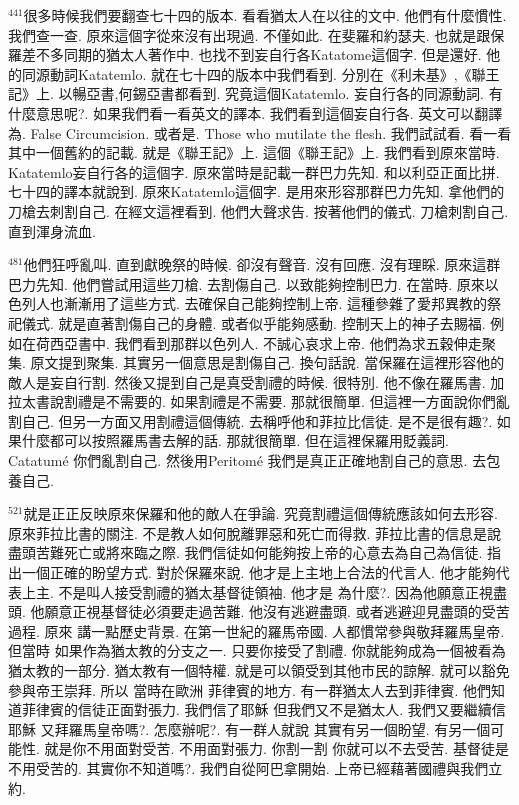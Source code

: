 \documentclass{book}
\begin{document}
$^{441}$很多時候我們要翻查七十四的版本.
看看猶太人在以往的文中.
他們有什麼慣性.
我們查一查.
原來這個字從來沒有出現過.
不僅如此.
在斐羅和約瑟夫.
也就是跟保羅差不多同期的猶太人著作中.
也找不到妄自行各Katatome這個字.
但是還好.
他的同源動詞Katatemlo.
就在七十四的版本中我們看到.
分別在《利未基》,《聯王記》上.
以暢亞書,何錫亞書都看到.
究竟這個Katatemlo.
妄自行各的同源動詞.
有什麼意思呢?.
如果我們看一看英文的譯本.
我們看到這個妄自行各.
英文可以翻譯為.
False Circumcision.
或者是.
Those who mutilate the flesh.
我們試試看.
看一看其中一個舊約的記載.
就是《聯王記》上.
這個《聯王記》上.
我們看到原來當時.
Katatemlo妄自行各的這個字.
原來當時是記載一群巴力先知.
和以利亞正面比拼.
七十四的譯本就說到.
原來Katatemlo這個字.
是用來形容那群巴力先知.
拿他們的刀槍去刺割自己.
在經文這裡看到.
他們大聲求告.
按著他們的儀式.
刀槍刺割自己.
直到渾身流血.

$^{481}$他們狂呼亂叫.
直到獻晚祭的時候.
卻沒有聲音.
沒有回應.
沒有理睬.
原來這群巴力先知.
他們嘗試用這些刀槍.
去割傷自己.
以致能夠控制巴力.
在當時.
原來以色列人也漸漸用了這些方式.
去確保自己能夠控制上帝.
這種參雜了愛邦異教的祭祀儀式.
就是直著割傷自己的身體.
或者似乎能夠感動.
控制天上的神子去賜福.
例如在荷西亞書中.
我們看到那群以色列人.
不誠心哀求上帝.
他們為求五穀伸走聚集.
原文提到聚集.
其實另一個意思是割傷自己.
換句話說.
當保羅在這裡形容他的敵人是妄自行割.
然後又提到自己是真受割禮的時候.
很特別.
他不像在羅馬書.
加拉太書說割禮是不需要的.
如果割禮是不需要.
那就很簡單.
但這裡一方面說你們亂割自己.
但另一方面又用割禮這個傳統.
去稱呼他和菲拉比信徒.
是不是很有趣?.
如果什麼都可以按照羅馬書去解的話.
那就很簡單.
但在這裡保羅用貶義詞.
Catatumé 你們亂割自己.
然後用Peritomé 我們是真正正確地割自己的意思.
去包養自己.

$^{521}$就是正正反映原來保羅和他的敵人在爭論.
究竟割禮這個傳統應該如何去形容.
原來菲拉比書的關注.
不是教人如何脫離罪惡和死亡而得救.
菲拉比書的信息是說盡頭苦難死亡或將來臨之際.
我們信徒如何能夠按上帝的心意去為自己為信徒.
指出一個正確的盼望方式.
對於保羅來說.
他才是上主地上合法的代言人.
他才能夠代表上主.
不是叫人接受割禮的猶太基督徒領袖.
他才是 為什麼?.
因為他願意正視盡頭.
他願意正視基督徒必須要走過苦難.
他沒有逃避盡頭.
或者逃避迎見盡頭的受苦過程.
原來 講一點歷史背景.
在第一世紀的羅馬帝國.
人都慣常參與敬拜羅馬皇帝.
但當時 如果作為猶太教的分支之一.
只要你接受了割禮.
你就能夠成為一個被看為猶太教的一部分.
猶太教有一個特權.
就是可以領受到其他市民的諒解.
就可以豁免參與帝王崇拜.
所以 當時在歐洲 菲律賓的地方.
有一群猶太人去到菲律賓.
他們知道菲律賓的信徒正面對張力.
我們信了耶穌 但我們又不是猶太人.
我們又要繼續信耶穌 又拜羅馬皇帝嗎?.
怎麼辦呢?.
有一群人就說 其實有另一個盼望.
有另一個可能性.
就是你不用面對受苦.
不用面對張力.
你割一割 你就可以不去受苦.
基督徒是不用受苦的.
其實你不知道嗎?.
我們自從阿巴拿開始.
上帝已經藉著國禮與我們立約.
\end{document}

